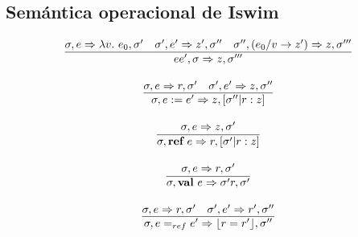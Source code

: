     \subsection{Semántica operacional de Iswim}   
      \[\begin{array}{c}
        \underline{\sigma,e \Rightarrow \lambda v.\ e_0,\sigma'\quad \sigma',e' \Rightarrow z',\sigma''\quad \sigma'', (e_0/v\rightarrow z') \Rightarrow z,\sigma'''}\\
        ee',\sigma \Rightarrow z,\sigma''' \\ \\
        \underline{\sigma,e \Rightarrow r,\sigma'\quad \sigma',e' \Rightarrow z,\sigma''} \\
        \sigma,e:=e' \Rightarrow z,[\sigma''|r:z] \\ \\
        \sigma,e \Rightarrow z,\sigma' \\
        \overline{\sigma,\textbf{ref}\ e \Rightarrow r,[\sigma'|r:z]} \\ \\
        \sigma,e \Rightarrow r,\sigma' \\
        \overline{\sigma,\textbf{val}\ e \Rightarrow \sigma' r,\sigma'} \\ \\
        \underline{\sigma,e \Rightarrow r,\sigma'\quad \sigma',e' \Rightarrow r',\sigma''} \\
        \sigma,e=_{ref}e' \Rightarrow \lfloor r=r'\rfloor,\sigma'' 
      \end{array}\]

